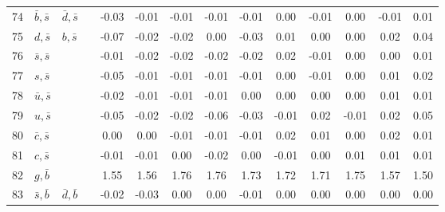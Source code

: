 \begin{tabularx}{\textwidth}{rXXX@{}S@{}S@{}S@{}S@{}S@{}S@{}S@{}S@{}S@{}S}
 74 & $\bar b, \bar s$ & $\bar d, \bar s$  &                  & -0.03 & -0.01 & -0.01 & -0.01 & -0.01 &  0.00 & -0.01 &  0.00 & -0.01 &  0.01 \\
 75 & $d, \bar s$      & $b, \bar s$       &                  & -0.07 & -0.02 & -0.02 &  0.00 & -0.03 &  0.01 &  0.00 &  0.00 &  0.02 &  0.04 \\
 76 & $\bar s, \bar s$ &                   &                  & -0.01 & -0.02 & -0.02 & -0.02 & -0.02 &  0.02 & -0.01 &  0.00 &  0.00 &  0.01 \\
 77 & $s, \bar s$      &                   &                  & -0.05 & -0.01 & -0.01 & -0.01 & -0.01 &  0.00 & -0.01 &  0.00 &  0.01 &  0.02 \\
 78 & $\bar u, \bar s$ &                   &                  & -0.02 & -0.01 & -0.01 & -0.01 &  0.00 &  0.00 &  0.00 &  0.00 &  0.01 &  0.01 \\
 79 & $u, \bar s$      &                   &                  & -0.05 & -0.02 & -0.02 & -0.06 & -0.03 & -0.01 &  0.02 & -0.01 &  0.02 &  0.05 \\
 80 & $\bar c, \bar s$ &                   &                  &  0.00 &  0.00 & -0.01 & -0.01 & -0.01 &  0.02 &  0.01 &  0.00 &  0.02 &  0.01 \\
 81 & $c, \bar s$      &                   &                  & -0.01 & -0.01 &  0.00 & -0.02 &  0.00 & -0.01 &  0.00 &  0.01 &  0.01 &  0.01 \\
 82 & $g, \bar b$      &                   &                  &  1.55 &  1.56 &  1.76 &  1.76 &  1.73 &  1.72 &  1.71 &  1.75 &  1.57 &  1.50 \\
 83 & $\bar s, \bar b$ & $\bar d, \bar b$  &                  & -0.02 & -0.03 &  0.00 &  0.00 & -0.01 &  0.00 &  0.00 &  0.00 &  0.00 &  0.00 \\
\bottomrule
\end{tabularx}







